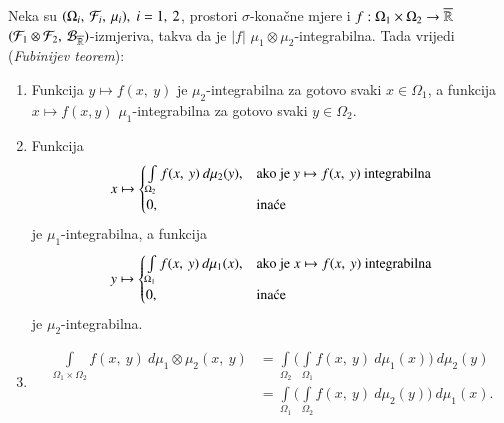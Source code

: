 \begin{zad} \label{zad:4.16}
    Neka su $(\Omega_i, \: \mathcal{F}_i, \: \mu_i), \; i = 1, \: 2$, prostori $\sigma$-kona\v cne mjere i $f : \Omega_1 \times \Omega_2 \to \overline{\mathbb{R}}$ $({\mathcal{F}_1 \otimes \mathcal{F}_2}, \: {\mathcal{B}_{\overline{\mathbb{R}}}})$-izmjeriva, takva da je $|f|$ $\mu_1 \otimes \mu_2$-integrabilna.
    Tada vrijedi (\emph{Fubinijev teorem}):
    \begin{enumerate}[label=(\roman*)]
        \item Funkcija $y \mapsto f(x, \: y)$ je $\mu_2$-integrabilna za gotovo svaki $x \in \Omega_1$, a funkcija $x \mapsto f(x, y)$ $\mu_1$-integrabilna za gotovo svaki $y \in \Omega_2$.
        \item Funkcija
        \begin{equation*}
            x \mapsto
            \begin{cases}
                \int\limits_{\Omega_2} f(x, \: y) \: d \mu_2 (y), &\textnormal{ako je } y \mapsto f(x, \: y) \textnormal{ integrabilna}\\
                0, &\textnormal{ina\' ce} 
            \end{cases}
        \end{equation*}
        je $\mu_1$-integrabilna, a funkcija
        \begin{equation*}
            y \mapsto
            \begin{cases}
                \int\limits_{\Omega_1} f(x, \: y) \: d \mu_1 (x), &\textnormal{ako je } x \mapsto f(x, \: y) \textnormal{ integrabilna}\\
                0, &\textnormal{ina\' ce}
            \end{cases}
        \end{equation*}
        je $\mu_2$-integrabilna.
        \item
        \begin{align*}
            \int\limits_{\Omega_1 \times \Omega_2}  f(x, \: y) \: d \mu_1 \otimes \mu_2 (x, \: y)  &= \int\limits_{\Omega_2} \Big( \int\limits_{\Omega_1} f(x, \: y) \: d \mu_1 (x) \Big) \: d \mu_2(y)\\
            &= \int\limits_{\Omega_1} \Big( \int\limits_{\Omega_2} f(x, \: y) \: d \mu_2 (y) \Big) \: d \mu_1(x).
        \end{align*}
    \end{enumerate}
\end{zad}

